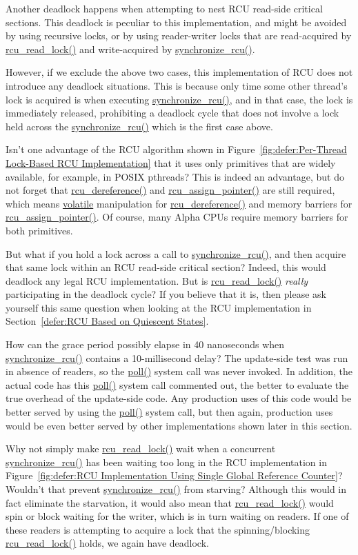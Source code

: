 	Another deadlock happens when attempting to nest RCU read-side
	critical sections.
	This deadlock is peculiar to this implementation, and might
	be avoided by using recursive locks, or by using reader-writer
	locks that are read-acquired by \url{rcu_read_lock()} and
	write-acquired by \url{synchronize_rcu()}.

	However, if we exclude the above two cases,
	this implementation of RCU does not introduce any deadlock
	situations.
	This is because only time some other thread's lock is acquired is when
	executing \url{synchronize_rcu()}, and in that case, the lock
	is immediately released, prohibiting a deadlock cycle that
	does not involve a lock held across the \url{synchronize_rcu()}
	which is the first case above.

\QuickQ{}
	Isn't one advantage of the RCU algorithm shown in
	Figure~\ref{fig:defer:Per-Thread Lock-Based RCU Implementation}
	that it uses only primitives that are widely available,
	for example, in POSIX pthreads?
\QuickA{}
	This is indeed an advantage, but do not forget that
	\url{rcu_dereference()} and \url{rcu_assign_pointer()}
	are still required, which means \url{volatile} manipulation
	for \url{rcu_dereference()} and memory barriers for
	\url{rcu_assign_pointer()}.
	Of course, many Alpha CPUs require memory barriers for both
	primitives.

\QuickQ{}
	But what if you hold a lock across a call to
	\url{synchronize_rcu()}, and then acquire that same lock within
	an RCU read-side critical section?
\QuickA{}
	Indeed, this would deadlock any legal RCU implementation.
	But is \url{rcu_read_lock()} \emph{really} participating in
	the deadlock cycle?
	If you believe that it is, then please
	ask yourself this same question when looking at the
	RCU implementation in
	Section~\ref{defer:RCU Based on Quiescent States}.

\QuickQ{}
	How can the grace period possibly elapse in 40 nanoseconds when
	\url{synchronize_rcu()} contains a 10-millisecond delay?
\QuickA{}
	The update-side test was run in absence of readers, so the
	\url{poll()} system call was never invoked.
	In addition, the actual code has this \url{poll()}
	system call commented out, the better to evaluate the
	true overhead of the update-side code.
	Any production uses of this code would be better served by
	using the \url{poll()} system call, but then again,
	production uses would be even better served by other implementations
	shown later in this section.

\QuickQ{}
	Why not simply make \url{rcu_read_lock()} wait when a concurrent
	\url{synchronize_rcu()} has been waiting too long in
	the RCU implementation in
	Figure~\ref{fig:defer:RCU Implementation Using Single Global Reference Counter}?
	Wouldn't that prevent \url{synchronize_rcu()} from starving?
\QuickA{}
	Although this would in fact eliminate the starvation, it would
	also mean that \url{rcu_read_lock()} would spin or block waiting
	for the writer, which is in turn waiting on readers.
	If one of these readers is attempting to acquire a lock that
	the spinning/blocking \url{rcu_read_lock()} holds, we again
	have deadlock.

